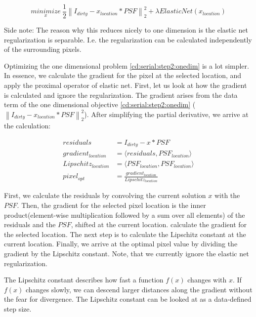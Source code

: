 \begin{equation}\label{cd:serial:step2:onedim}
\underset{x}{minimize} \: \frac{1}{2} \left \| I_{dirty} - x_{location} * PSF \right \|_2^2 + \lambda ElasticNet(x_{location})
\end{equation}

Side note: The reason why this reduces nicely to one dimension is the elastic net regularization is separable. I.e. the regularization can be calculated independently of the surrounding pixels.

Optimizing the one dimensional problem \eqref{cd:serial:step2:onedim} is a lot simpler. In essence, we calculate the gradient for the pixel at the selected location, and apply the proximal operator of elastic net. First, let us look at how the gradient is calculated and ignore the regularization. The gradient arises from the data term of the one dimensional objective \eqref{cd:serial:step2:onedim} ($\left \| I_{dirty} - x_{location} * PSF \right \|_2^2$). After simplifying the partial derivative, we arrive at the calculation:

\begin{equation}\label{cd:serial:step2:gradient}
\begin{split}
residuals &= I_{dirty} - x * PSF \\
gradient_{location} &= \langle residuals, PSF_{location} \rangle \\
Lipschitz_{location} &= \langle PSF_{location}, PSF_{location} \rangle \\
pixel_{opt} &= \frac{gradient_{location}}{Lipschitz_{location}}
\end{split}
\end{equation}

First, we calculate the residuals by convolving the current solution $x$ with the $PSF$. Then, the gradient for the selected pixel location is the inner product(element-wise multiplication followed by a sum over all elements) of the residuals and the $PSF$, shifted at the current location. calculate the gradient for the selected location. The next step is to calculate the Lipschitz constant at the current location. Finally, we arrive at the optimal pixel value by dividing the gradient by the Lipschitz constant. Note, that we currently ignore the elastic net regularization.

The Lipschitz constant describes how fast a function $f(x)$ changes with $x$. If $f(x)$ changes slowly, we can descend larger distances along the gradient without the fear for divergence. The Lipschitz constant can be looked at as a data-defined step size.

